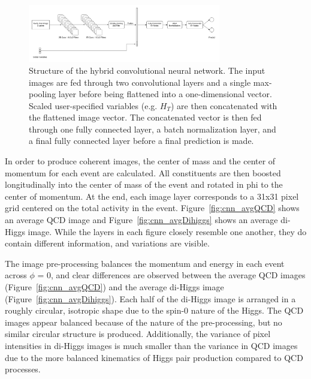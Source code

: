 \begin{figure}[!h] 
\begin{center}
\includegraphics*[width=0.75\textwidth] {CNN/figures/hybridCNN.png}
\caption{Structure of the hybrid convolutional neural network. The input images are fed through two convolutional layers and a single max-pooling layer before being flattened into a one-dimensional vector. Scaled user-specified variables (e.g. $H_{T}$) are then concatenated with the flattened image vector. The concatenated vector is then fed through one fully connected layer, a batch normalization layer, and a final fully connected layer before a final prediction is made.}
  \label{fig:cnn_hybrid}
\end{center}
\end{figure}

In order to produce coherent images, the center of mass and the center of momentum for each event are calculated. All constituents are then boosted longitudinally into the center of mass of the event and rotated in phi to the center of momentum. At the end, each image layer corresponds to a 31x31 pixel grid centered on the total activity in the event. Figure~\ref{fig:cnn_avgQCD} shows an average QCD image and Figure~\ref{fig:cnn_avgDihiggs} shows an average di-Higgs image. While the layers in each figure closely resemble one another, they do contain different information, and variations are visible.

The image pre-processing balances the momentum and energy in each event across $\phi$ = 0, and clear differences are observed between the average QCD images (Figure~\ref{fig:cnn_avgQCD}) and the average di-Higgs image (Figure~\ref{fig:cnn_avgDihiggs}). Each half of the di-Higgs image is arranged in a roughly circular, isotropic shape due to the spin-0 nature of the Higgs. The QCD images appear balanced because of the nature of the pre-processing, but no similar circular structure is produced. Additionally, the variance of pixel intensities in di-Higgs images is much smaller than the variance in QCD images due to the more balanced kinematics of Higgs pair production compared to QCD processes.

